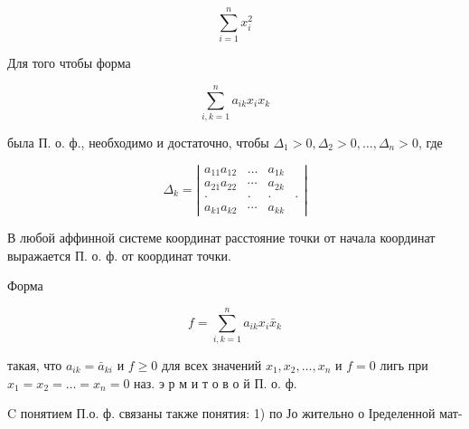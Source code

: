 \documentclass[10pt]{article}
\begin{document}
\[

\sum_{i=1}^{n} x_{i}^{2}

\]



Для того чтобы форма



\[

\sum_{i, k=1}^{n} a_{i k} x_{i} x_{k}

\]



была П. о. ф., необходимо и достаточно, чтобы $\Delta_{1}>0, \Delta_{2}>0, \ldots, \Delta_{n}>0$, где



\[

\Delta_{k}=\left|\begin{array}{cccc}

a_{11} a_{12} & \ldots & a_{1 k} \\

a_{21} a_{22} & \cdots & a_{2 k} \\

\cdot & \cdot & \cdot & \cdot \\

a_{k 1} a_{k 2} & \cdots & a_{k k}

\end{array}\right|

\]



В любой аффинной системе координат расстояние точки от начала координат выражается П. о. ф. от координат точки.



Форма



\[

f=\sum_{i, k=1}^{n} a_{i k} x_{i} \bar{x}_{k}

\]



такая, что $a_{i k}=\bar{a}_{k i}$ и $f \geqslant 0$ для всех значений $x_{1}, x_{2}, \ldots, x_{n}$ и $f=0$ лигь при $x_{1}=x_{2}=\ldots=x_{n}=0$ наз. э р м и т о в о й П. о. ф.



$\mathrm{C}$ понятием П.о. ф. связаны также понятия: 1) по Јо жительно о Іределенной мат-
\end{document}
